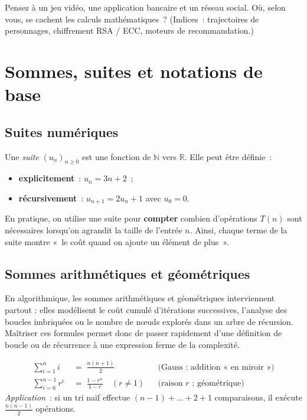 
\begin{reflexion}
Pensez à un jeu vidéo, une application bancaire et un réseau social. Où, selon
vous, se cachent les calculs mathématiques ? (Indices : trajectoires de
personnages, chiffrement RSA / ECC, moteurs de recommandation.)
\end{reflexion}

\section{Sommes, suites et notations de base}

\subsection{Suites numériques}
Une \emph{suite} $(u_n)_{n\ge 0}$ est une fonction de $\mathbb N$ vers
$\mathbb R$. Elle peut être définie :
\begin{itemize}
  \item \textbf{explicitement} : $u_n = 3n+2$ ;
  \item \textbf{récursivement} : $u_{n+1}=2u_n+1$ avec $u_0=0$.
\end{itemize}
En pratique, on utilise une suite pour \textbf{compter} combien d’opérations $T(n)$ sont nécessaires lorsqu’on agrandit la taille de l’entrée $n$. Ainsi, chaque terme de la suite montre « le coût quand on ajoute un élément de plus ».


\subsection{Sommes arithmétiques et géométriques}

En algorithmique, les sommes arithmétiques et géométriques interviennent partout : elles modélisent le coût cumulé d’itérations successives, l’analyse des boucles imbriquées ou le nombre de nœuds explorés dans un arbre de récursion. Maîtriser ces formules permet donc de passer rapidement d’une définition de boucle ou de récurrence à une expression ferme de la complexité.

\begin{align*}
\sum_{i=1}^{n} i &\;=\; \frac{n(n+1)}{2} && \text{(Gauss : addition « en miroir »)}\\[0.4em]
\sum_{i=0}^{n-1} r^{i} &\;=\; \frac{1-r^{n}}{1-r}\quad (r\neq 1) && \text{(raison $r$ ; géométrique)}
\end{align*}
\emph{Application} : si un tri naïf effectue $(n-1)+\dots+2+1$ comparaisons,
il exécute $\tfrac{n(n-1)}{2}$ opérations.


